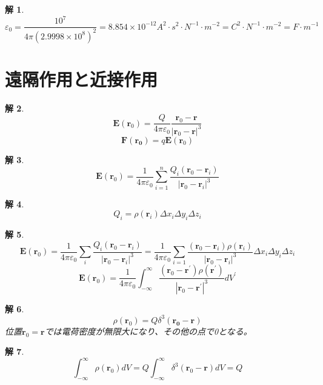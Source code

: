 \documentclass{jsarticle}
\newtheorem{ans}{解}[section]
\begin{document}
\begin{ans}~\\
\[\varepsilon_{0}=\frac{10^{7}}{4\pi(2.9998\times10^{8})^{2}}=8.854\times10^{-12}A^2\cdot s^{2}\cdot N^{-1}\cdot m^{-2}=C^{2}\cdot N^{-1}\cdot m^{-2}=F\cdot m^{-1}\]
\end{ans}
\section{遠隔作用と近接作用}
\noindent
\begin{ans}~\\
\[\bm{E}(\bm{r}_{0})=\frac{Q}{4\pi\varepsilon_{0}}\frac{\bm{r}_{0}-\bm{r}}{\left|\bm{r}_{0}-\bm{r}\right|^{3}}\]
\[\bm{F}(\bm{r_{0}})=q\bm{E}(\bm{r}_{0})\]
\end{ans}

\begin{ans}~\\
\[\bm{E}(\bm{r}_{0})=\frac{1}{4\pi\varepsilon_{0}}\sum_{i=1}^{n}\frac{Q_{i}(\bm{r}_{0}-\bm{r}_{i})}{\left|\bm{r}_{0}-\bm{r}_{i}\right|^{3}}\]
\end{ans}

\begin{ans}~\\
\[Q_{i}=\rho(\bm{r}_{i})\Delta x_{i}\Delta y_{i}\Delta z_{i}\]
\end{ans}

\begin{ans}~\\
\[\bm{E}(\bm{r}_{0})=\frac{1}{4\pi\varepsilon_{0}}\sum_{i}\frac{Q_{i}(\bm{r}_{0}-\bm{r}_{i})}{\left|\bm{r}_{0}-\bm{r}_{i}\right|^{3}}=\frac{1}{4\pi\varepsilon_{0}}\sum_{i=1}\frac{(\bm{r}_{0}-\bm{r}_{i})\rho(\bm{r}_{i})}{\left|\bm{r}_{0}-\bm{r}_{i}\right|^{3}}\Delta x_{i}\Delta y_{i}\Delta z_{i}\]
\[\bm{E}(\bm{r}_{0})=\frac{1}{4\pi\varepsilon_{0}}\int_{-\infty}^{\infty}\frac{(\bm{r}_{0}-\bm{r}^{\prime})\rho(\bm{r}^{\prime})}{\left|\bm{r}_{0}-\bm{r}^{\prime}\right|^{3}}dV^{\prime}\]
\end{ans}

\begin{ans}~\\
\[\rho(\bm{r}_{0})=Q\delta^{3}(\bm{r_{0}-\bm{r}})\]
位置\(\bm{r}_{0}=\bm{r}\)では電荷密度が無限大になり、その他の点で0となる。
\end{ans}

\begin{ans}~\\
\[\int_{-\infty}^{\infty}\rho(\bm{r}_{0})dV=Q\int_{-\infty}^{\infty}\delta^{3}(\bm{r}_{0}-\bm{r})dV=Q\]
\end{ans}
\end{document}
